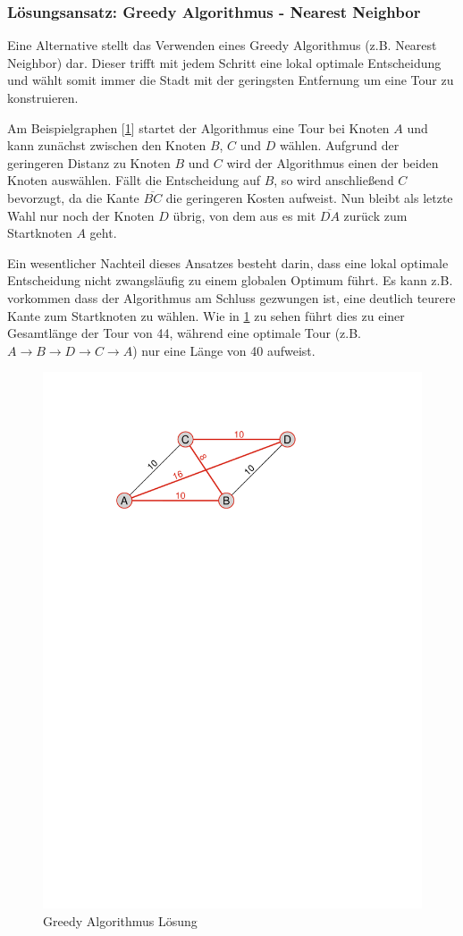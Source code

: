 \documentclass[pdftex,
               12pt,
               DIV=12,
               a4paper,
               twoside,
               parskip=half,
               abstract=true,
               dvipsnames]{scrartcl}
\begin{document}
\subsubsection{L\"osungsansatz: Greedy Algorithmus - Nearest Neighbor}
Eine Alternative stellt das Verwenden eines Greedy Algorithmus (z.B. Nearest Neighbor) dar. Dieser trifft mit jedem Schritt eine lokal optimale Entscheidung und w\"ahlt somit immer die Stadt mit der geringsten Entfernung um eine Tour zu konstruieren. \cite[vgl.][]{DorigoStuetzle04}

Am Beispielgraphen [\cref{fig:ACO_greedygraph}] startet der Algorithmus eine Tour bei Knoten $A$ und kann zun\"achst zwischen den Knoten $B$, $C$ und $D$ w\"ahlen. Aufgrund der geringeren Distanz zu Knoten $B$ und $C$ wird der Algorithmus einen der beiden Knoten ausw\"ahlen. F\"allt die Entscheidung auf $B$, so wird anschlie\ss end $C$ bevorzugt, da die Kante $\overline{BC}$ die geringeren Kosten aufweist. Nun bleibt als letzte Wahl nur noch der Knoten $D$ \"ubrig, von dem aus es mit $\overline{DA}$ zur\"uck zum Startknoten $A$ geht.

Ein wesentlicher Nachteil dieses Ansatzes besteht darin, dass eine lokal optimale Entscheidung nicht zwangsl\"aufig zu einem globalen Optimum f\"uhrt. Es kann z.B. vorkommen dass der Algorithmus am Schluss gezwungen ist, eine deutlich teurere Kante zum Startknoten zu w\"ahlen. Wie in \cref{fig:ACO_greedygraph} zu sehen f\"uhrt dies zu einer Gesamtl\"ange der Tour von 44, w\"ahrend eine optimale Tour (z.B. $A \rightarrow B \rightarrow D \rightarrow C \rightarrow A$) nur eine L\"ange von 40 aufweist. \cite[vgl.][]{DorigoStuetzle04}

\begin{figure}[h]
	\begin{center}
		\includegraphics[width=0.5\linewidth, page=1]{aco_nearest_neighbor}
	\end{center}
	\caption{Greedy Algorithmus L\"osung} \label{fig:ACO_greedygraph}
\end{figure}
\end{document}
